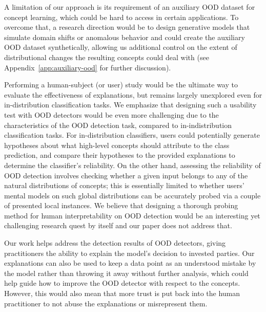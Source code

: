 A limitation of our approach is its requirement of an auxiliary OOD dataset for concept learning, which could be hard to access in certain applications.
To overcome that, a research direction would be to design generative models that simulate domain shifts or anomalous behavior and could create the auxiliary OOD dataset synthetically, allowing us additional control on the extent of distributional changes the resulting concepts could deal with (see Appendix~\ref{app:auxiliary-ood} for further discussion). 


Performing a human-subject (or user) study would be the ultimate way to evaluate the effectiveness of explanations, but remains largely unexplored even for in-distribution classification tasks.  
We emphasize that designing such a usability test with OOD detectors would be even more challenging due to the characteristics of the OOD detection task, compared to in-indistribution classification tasks.
For in-distribution classifiers, users could potentially generate hypotheses about what high-level concepts should attribute to the class prediction, and compare their hypotheses to the provided explanations to determine the classifier's reliability.
On the other hand, assessing the reliability of OOD detection involves checking whether a given input belongs to any of the natural distributions of concepts; this is essentially limited to whether users' mental models on such global distributions can be accurately probed via a couple of presented local instances.
We believe that designing a thorough probing method for human interpretability on OOD detection would be an interesting yet challenging research quest by itself and our paper does not address that.

\label{sec:broader_impact}
Our work helps address the detection results of OOD detectors, giving practitioners the ability to explain the model's decision to invested parties. 
Our explanations can also be used to keep a data point as an understood mistake by the model rather than throwing it away without further analysis, which could help guide how to improve the OOD detector with respect to the concepts. 
However, this would also mean that more trust is put back into the human practitioner to not abuse the explanations or misrepresent them. 


